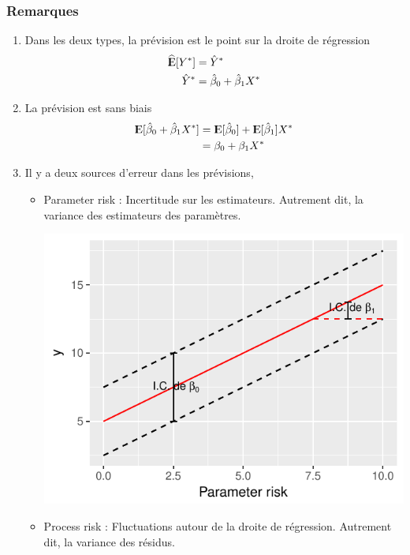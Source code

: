 \documentclass[11pt,french]{report}
\newcommand{\E}{{\rm I\kern-.3em E}}
\begin{document}
\subsubsection*{Remarques}
\begin{enumerate}
\item Dans les deux types, la prévision est le point sur la droite de régression
\begin{align*}
\widehat{\E}[Y^*] &= \hat{Y}^* \\
\hat{Y}^* &= \hat{\beta}_0 +  \hat{\beta}_1X^*
\end{align*}
\item La prévision est sans biais 
\begin{align*}
\E[\hat{\beta}_0 +  \hat{\beta}_1X^*] &= \E[\hat{\beta}_0] + \E[\hat{\beta}_1]X^* \\
&= \beta_0 +  \beta_1X^*
\end{align*}
\item Il y a deux sources d'erreur dans les prévisions,
\bigskip
\begin{itemize}
\item Parameter risk : Incertitude sur les estimateurs. Autrement dit, la variance des estimateurs des paramètres.

\includegraphics{notes_de_cours-017}

\bigskip
\item Process risk : Fluctuations autour de la droite de régression. Autrement dit, la variance des résidus.
\bigskip


\end{itemize}
\end{enumerate}
\end{document}
